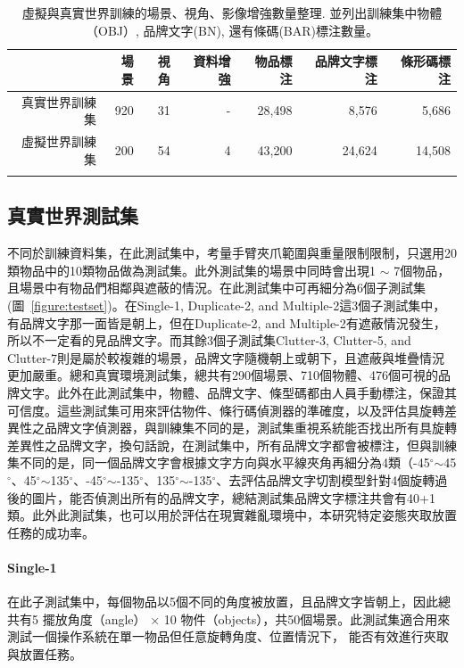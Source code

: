 \begin{table}[H]
\caption{虛擬與真實世界訓練的場景、視角、影像增強數量整理. 並列出訓練集中物體（OBJ）, 品牌文字(BN), 還有條碼(BAR)標注數量。}
\centering
\begin{tabular}{rrrr|rrr}
\hline
         & 場景 & 視角 & 資料增強 & 物品標注       & 品牌文字標注       & 條形碼標注 \\ \hline
真實世界訓練集 	& 920   & 31   & -        & 28,498       & 8,576    & 5,686     \\
虛擬世界訓練集   	& 200   & 54   & 4      & 43,200       & 24,624         & 14,508          \\
\hline
\label{table:training_set_table}
\end{tabular}
\end{table}

\subsection{真實世界測試集}
不同於訓練資料集，在此測試集中，考量手臂夾爪範圍與重量限制限制，只選用20類物品中的10類物品做為測試集。此外測試集的場景中同時會出現1 $\sim$ 7個物品，且場景中有物品們相鄰與遮蔽的情況。在此測試集中可再細分為6個子測試集(圖~\ref{figure:testset})。在Single-1, Duplicate-2, and Multiple-2這3個子測試集中，有品牌文字那一面皆是朝上，但在Duplicate-2, and Multiple-2有遮蔽情況發生，所以不一定看的見品牌文字。而其餘3個子測試集Clutter-3, Clutter-5, and Clutter-7則是屬於較複雜的場景，品牌文字隨機朝上或朝下，且遮蔽與堆疊情況更加嚴重。總和真實環境測試集，總共有290個場景、710個物體、476個可視的品牌文字。此外在此測試集中，物體、品牌文字、條型碼都由人員手動標注，保證其可信度。這些測試集可用來評估物件、條行碼偵測器的準確度，以及評估具旋轉差異性之品牌文字偵測器，與訓練集不同的是，測試集重視系統能否找出所有具旋轉差異性之品牌文字，換句話說，在測試集中，所有品牌文字都會被標注，但與訓練集不同的是，同一個品牌文字會根據文字方向與水平線夾角再細分為4類（-45$^{\circ}$$\sim$45$^{\circ}$、45$^{\circ}$$\sim$135$^{\circ}$、-45$^{\circ}$$\sim$-135$^{\circ}$、135$^{\circ}$$\sim$-135$^{\circ}$、去評估品牌文字切割模型針對4個旋轉過後的圖片，能否偵測出所有的品牌文字，總結測試集品牌文字標注共會有40+1類。此外此測試集，也可以用於評估在現實雜亂環境中，本研究特定姿態夾取放置任務的成功率。

\paragraph{Single-1}
在此子測試集中，每個物品以5個不同的角度被放置，且品牌文字皆朝上，因此總共有5 擺放角度（angle） $\times$ 10 物件（objects），共50個場景。此測試集適合用來測試一個操作系統在單一物品但任意旋轉角度、位置情況下， 能否有效進行夾取與放置任務。

